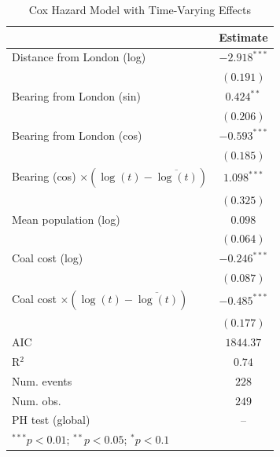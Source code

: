 
\begin{table}
\begin{center}
\begin{tabular}{l c}
\hline
 & Estimate \\
\hline
Distance from London (log) & $-2.918^{***}$ \\
 & $(0.191)$ \\
Bearing from London (sin) & $0.424^{**}$ \\
 & $(0.206)$ \\
Bearing from London (cos) & $-0.593^{***}$ \\
 & $(0.185)$ \\
Bearing (cos) $\times (\log(t)-\overline{\log(t)})$ & $1.098^{***}$ \\
 & $(0.325)$ \\
Mean population (log) & $0.098$ \\
 & $(0.064)$ \\
Coal cost (log) & $-0.246^{***}$ \\
 & $(0.087)$ \\
Coal cost $\times (\log(t)-\overline{\log(t)})$ & $-0.485^{***}$ \\
 & $(0.177)$ \\
\hline
AIC              & $1844.37$ \\
R$^2$            & $0.74$ \\
Num. events      & $228$ \\
Num. obs.        & $249$ \\
PH test (global) & -- \\
\hline
\multicolumn{2}{l}{\scriptsize{$^{***}p<0.01$; $^{**}p<0.05$; $^{*}p<0.1$}}
\end{tabular}
\caption{Cox Hazard Model with Time-Varying Effects}
\label{tab:cox_tv}
\end{center}
\end{table}
